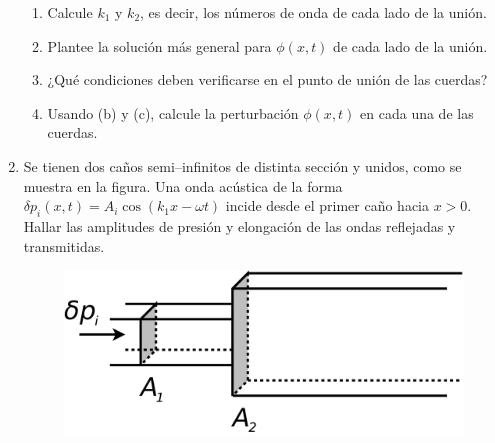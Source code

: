\documentclass[11pt,spanish,a4paper]{article}
\begin{document}
\begin{enumerate}
\begin{enumerate}
\item Calcule $k_{1}$ y $k_{2}$, es decir, los números de onda de cada
lado de la unión.
\item Plantee la solución más general para $\phi(x,t)$ de cada lado de
la unión.
\item ¿Qué condiciones deben verificarse en el punto de unión de las cuerdas?
\item Usando (b) y (c), calcule la perturbación $\phi(x,t)$ en cada una
de las cuerdas.
\end{enumerate}
\item Se tienen dos caños semi--infinitos de distinta sección y unidos,
como se muestra en la figura. Una onda acústica de la forma $\delta p_{i}(x,t)=A_{i}\cos\left(k_{1}x-\omega t\right)$
incide desde el primer caño hacia $x>0$. Hallar las amplitudes de
presión y elongación de las ondas reflejadas y transmitidas.
\begin{figure}[H]
\centering{}\includegraphics[clip,scale=0.25]{ej2-10}
\end{figure}



\end{enumerate}
\end{document}

